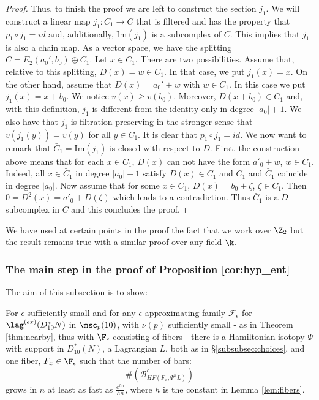 \begin{proof}
Thus, to finish the proof we are left to construct the section $j_{1}$. 
We will construct a linear map $j_{1}:C_{1}\to C$ that is filtered and has the property that $p_{1}\circ j_{1}=id$ and, additionally, $\mathrm{Im}(j_{1})$ is
a subcomplex of $C$. This implies that $j_{1}$ is also a chain map.
As a vector space, we have the splitting  $C=E_{2}(a_{0}',b_{0})\oplus C_{1}$.
Let $x\in C_{1}$. There are two possibilities. Assume that, relative to this splitting, $D(x)=w\in C_{1}$. In that case, we put $j_{1}(x)=x$. On the other hand, assume that $D(x)= a_{0}'+w$ with $w\in C_{1}$. In this case we put  $j_{1}(x)= x+ b_{0}$. We notice $v(x)\geq v(b_{0})$. Moreover, $D(x+b_{0})\in C_{1}$ and, with this definition, $j_{1}$ is different from the identity only in degree $|a_{0}|+1$.  We also have that $j_{1}$ is filtration preserving in the stronger sense that $v(j_{1}(y))=v(y)$ for all $y\in C_{1}$. It is clear that $p_{1}\circ j_{1}=id$.  We now want to remark that $\bar{C}_{1}=\mathrm{Im}(j_{1})$ is closed with respect to $D$. First, the construction
above means that for each $x\in \bar{C}_{1}$,  $D(x)$ can not 
have the form $a'_{0}+w$, $w\in \bar{C}_{1}$. Indeed,  all $x\in \bar{C}_{1}$ in degree $|a_{0}|+1$ satisfy $D(x)\in C_{1}$ and $C_{1}$ and $\bar{C}_{1}$ coincide in degree $|a_{0}|$. Now assume that for some $x\in \bar{C}_{1}$, $D(x)=b_{0} + \zeta$, $\zeta\in \bar{C}_{1}$.  Then  $0=D^{2}(x)= a'_{0} + D(\zeta)$ which leads to a contradiction. Thus $\bar{C}_{1}$ is a $D$-subcomplex in $C$ and this concludes the proof.
 \end{proof}
 
 \begin{rem} We have used at certain points in the proof the fact that we work over $\Z_2$ but the result remains true with a similar proof over any field $\k$.
 
 \end{rem}
 
\subsubsection{The main step in the proof of Proposition \ref{cor:hyp_ent}} The aim of this subsection is to  show:

\begin{lem}\label{lem:parrila}  For $\epsilon$ sufficiently small and for  any $\epsilon$-approximating family $\mathcal{F}_{\epsilon}$ for $\lag^{(ex)}(D^{\ast}_{10}N)$ in $\msc_{p}(10)$, with $\nu(p)$ sufficiently small - as in Theorem \ref{thm:nearby}, thus with $\F_{\epsilon}$ consisting of fibers - there is a Hamiltonian isotopy $\Psi$ with support in $D^{\ast}_{10}(N)$, a Lagrangian $L$, both as in \S \ref{subsubsec:choices}, and one fiber, $F_{x}\in \F_{\epsilon}$ such that the number of bars:
$$\# (\mathcal{B}^{\epsilon}_{HF(F_{x},\Psi^{n}L)})$$ grows in $n$ at least as fast as  $\frac{e^{hn}}{hn}$, where $h$ is the constant in Lemma \ref{lem:fibers}. 
\end{lem}

